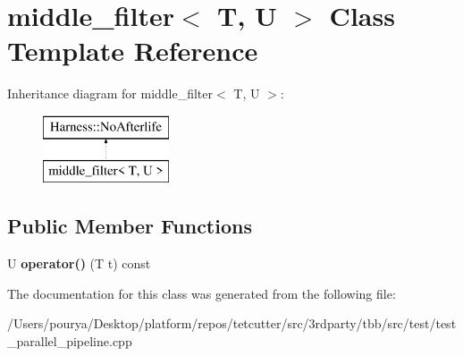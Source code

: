 \hypertarget{classmiddle__filter}{}\section{middle\+\_\+filter$<$ T, U $>$ Class Template Reference}
\label{classmiddle__filter}
Inheritance diagram for middle\+\_\+filter$<$ T, U $>$\+:\begin{figure}[H]
\begin{center}
\leavevmode
\includegraphics[height=2.000000cm]{classmiddle__filter}
\end{center}
\end{figure}
\subsection*{Public Member Functions}
\begin{DoxyCompactItemize}
\item 
\hypertarget{classmiddle__filter_ae996fd73e46cfde475e92b72fad90c49}{}U {\bfseries operator()} (T t) const \label{classmiddle__filter_ae996fd73e46cfde475e92b72fad90c49}

\end{DoxyCompactItemize}


The documentation for this class was generated from the following file\+:\begin{DoxyCompactItemize}
\item 
/\+Users/pourya/\+Desktop/platform/repos/tetcutter/src/3rdparty/tbb/src/test/test\+\_\+parallel\+\_\+pipeline.\+cpp\end{DoxyCompactItemize}
